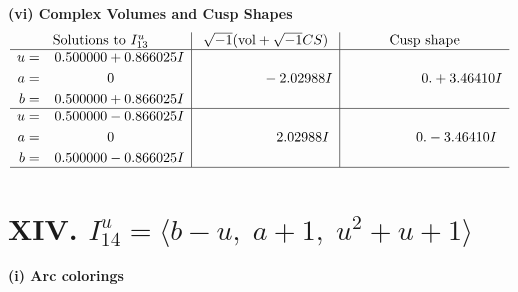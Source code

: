 \documentclass[1p]{elsarticle_modified}
\theoremstyle{definition}
\newcommand{\I}{\sqrt{-1}}
\begin{document}
\newpage\flushleft \textbf{(vi) Complex Volumes and Cusp Shapes}
$$\begin{array}{c|c|c}  
\text{Solutions to }I^u_{13}& \I (\text{vol} + \sqrt{-1}CS) & \text{Cusp shape}\\
 \hline 
\begin{aligned}
u &= \phantom{-}0.500000 + 0.866025 I \\
a &= \phantom{-0.000000 } 0 \\
b &= \phantom{-}0.500000 + 0.866025 I\end{aligned}
 & \phantom{-0.000000 } -2.02988 I & \phantom{-0.000000 -}0. + 3.46410 I \\ \hline\begin{aligned}
u &= \phantom{-}0.500000 - 0.866025 I \\
a &= \phantom{-0.000000 } 0 \\
b &= \phantom{-}0.500000 - 0.866025 I\end{aligned}
 & \phantom{-0.000000 -}2.02988 I & \phantom{-0.000000 } 0. - 3.46410 I\\
 \hline 
 \end{array}$$\newpage\newpage\renewcommand{\arraystretch}{1}
\centering \section*{XIV. $I^u_{14}= \langle b- u,\;a+1,\;u^2+u+1 \rangle$}
\flushleft \textbf{(i) Arc colorings}\\
\end{document}
